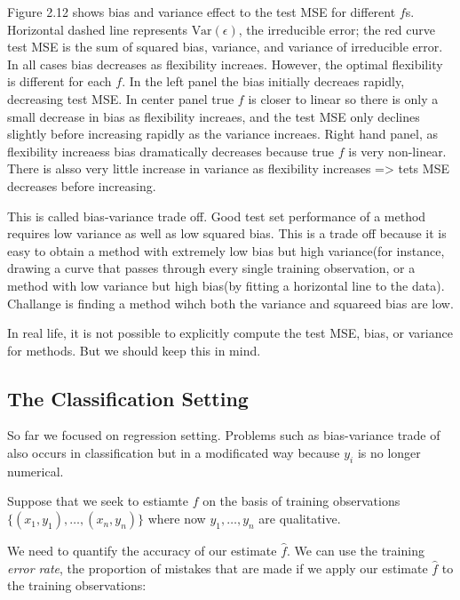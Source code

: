 \documentclass[
  letterpaper,
  DIV=11,
  numbers=noendperiod]{scrreprt}
\begin{document}
Figure 2.12 shows bias and variance effect to the test MSE for different
\(f\)s. Horizontal dashed line represents \(\text{Var}(\epsilon)\), the
irreducible error; the red curve test MSE is the sum of squared bias,
variance, and variance of irreducible error. In all cases bias decreases
as flexibility increaes. However, the optimal flexibility is different
for each \(f\). In the left panel the bias initially decreaes rapidly,
decreasing test MSE. In center panel true \(f\) is closer to linear so
there is only a small decrease in bias as flexibility increaes, and the
test MSE only declines slightly before increasing rapidly as the
variance increaes. Right hand panel, as flexibility increaess bias
dramatically decreases because true \(f\) is very non-linear. There is
alsso very little increase in variance as flexibility increases
=\textgreater{} tets MSE decreases before increasing.

This is called bias-variance trade off. Good test set performance of a
method requires low variance as well as low squared bias. This is a
trade off because it is easy to obtain a method with extremely low bias
but high variance(for instance, drawing a curve that passes through
every single training observation, or a method with low variance but
high bias(by fitting a horizontal line to the data). Challange is
finding a method wihch both the variance and squareed bias are low.

In real life, it is not possible to explicitly compute the test MSE,
bias, or variance for methods. But we should keep this in mind.

\hypertarget{the-classification-setting}{%
\subsection{The Classification
Setting}\label{the-classification-setting}}

So far we focused on regression setting. Problems such as bias-variance
trade of also occurs in classification but in a modificated way because
\(y_i\) is no longer numerical.

Suppose that we seek to estiamte \(f\) on the basis of training
observations \(\{(x_1,y_1), \dots, (x_n,y_n)\}\) where now
\(y_1,\dots, y_n\) are qualitative.

We need to quantify the accuracy of our estimate \(\hat{f}\). We can use
the training \emph{error rate}, the proportion of mistakes that are made
if we apply our estimate \(\hat{f}\) to the training observations:
\end{document}
